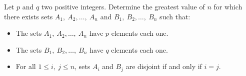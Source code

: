 Let $p$ and $q$ two positive integers. Determine the greatest value of $n$ for which there exists sets $A_1,\ A_2,\ldots,\ A_n$ and $B_1,\ B_2,\ldots,\ B_n$ such that:
\begin{itemize}
	\item The sets $A_1,\ A_2,\ldots,\ A_n$ have $p$ elements each one.
	\item The sets  $B_1,\ B_2,\ldots,\ B_n$ have $q$ elements each one.
	\item For all $1\leq i,\ j \leq n$, sets $A_i$ and $B_j$ are disjoint if and only if $i=j$.
\end{itemize}

